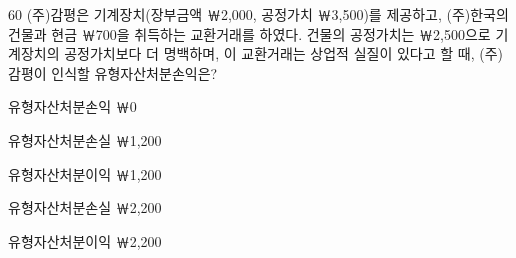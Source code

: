 \begin{question}{60}
(주)감평은 기계장치(장부금액 ￦2,000, 공정가치 ￦3,500)를 제공하고, (주)한국의 건물과 현금 ￦700을 취득하는 교환거래를 하였다. 건물의 공정가치는 ￦2,500으로 기계장치의 공정가치보다 더 명백하며, 이 교환거래는 상업적 실질이 있다고 할 때, (주)감평이 인식할 유형자산처분손익은?
\begin{choices}
  \item 유형자산처분손익 ￦0
  \item 유형자산처분손실 ￦1,200
  \item 유형자산처분이익 ￦1,200
  \item 유형자산처분손실 ￦2,200
  \item 유형자산처분이익 ￦2,200
\end{choices}
\end{question}
